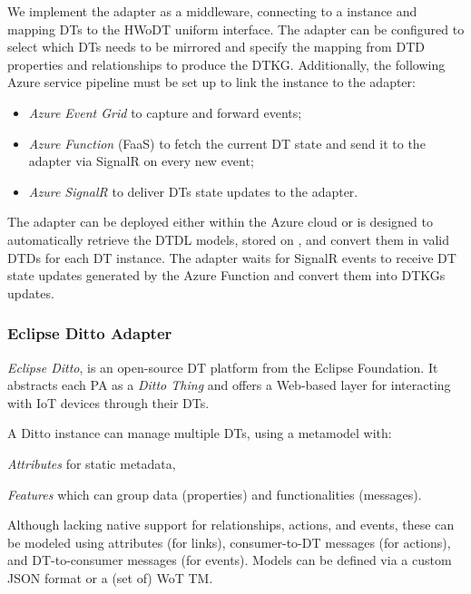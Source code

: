 We implement the \azureTwin{} adapter as a middleware, connecting to a \azureTwin{} instance and mapping \acp{DT} to the \ac{HWoDT} uniform interface.
%
The adapter can be configured to select which \acp{DT} needs to be mirrored and specify the mapping from \ac{DTD} properties and relationships to produce the \ac{DTKG}. 
Additionally, the following Azure service pipeline must be set up to link the \azureTwin{} instance to the adapter:
\begin{itemize}
    \item \textit{Azure Event Grid} to capture and forward \azureTwin{} events;
    \item \textit{Azure Function} (\acl{FaaS}) to fetch the current \ac{DT} state and send it to the adapter via SignalR on every new event;
    \item \textit{Azure SignalR} to deliver \acp{DT} state updates to the adapter.
\end{itemize}

The adapter can be deployed either within the Azure cloud or is designed to automatically retrieve the \ac{DTDL} models, stored on \azureTwin{}, and convert them in valid \acp{DTD} for each \ac{DT} instance.
The adapter waits for SignalR events to receive \ac{DT} state updates generated by the Azure Function and convert them into \acp{DTKG} updates.

\subsubsection{Eclipse Ditto Adapter}

\emph{Eclipse Ditto}, is an open-source \ac{DT} platform from the Eclipse Foundation. 
It abstracts each \ac{PA} as a \emph{Ditto Thing} and offers a Web-based layer for interacting with \ac{IoT} devices through their \acp{DT}.

A Ditto instance can manage multiple \acp{DT}, using a metamodel with:
\begin{inlinelist}
    \item \emph{Attributes} for static metadata,
    \item \emph{Features} which can group data (properties) and functionalities (messages).
\end{inlinelist}
Although lacking native support for relationships, actions, and events, these can be modeled using attributes (for links), consumer-to-\ac{DT} messages (for actions), and \ac{DT}-to-consumer messages (for events). Models can be defined via a custom JSON format or a (set of) \ac{WoT} \ac{TM}.

